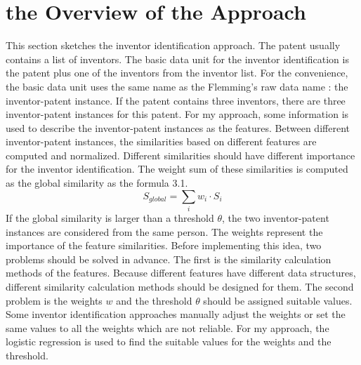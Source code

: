 \section{the Overview of the Approach}
This section sketches the inventor identification approach. The patent usually contains a list of inventors. The basic data unit for the inventor identification is the patent plus one of the inventors from the inventor list. For the convenience, the basic data unit uses the same name as the Flemming's raw data name \cite{RePEc:eee:respol:v:43:y:2014:i:6:p:941-955}: the inventor-patent instance. If the patent contains three inventors, there are three inventor-patent instances for this patent. For my approach, some information is used to describe the inventor-patent instances as the features. Between different inventor-patent instances, the similarities based on different features are computed and normalized. Different similarities should have different importance for the inventor identification. The weight sum of these similarities is computed as the global similarity as the formula 3.1. 
\begin{equation}
S_{global}=\sum_i w_i \cdot S_i 
\end{equation}
If the global similarity is larger than a threshold $\theta$, the two inventor-patent  instances are considered from the same person. The weights represent the importance of the feature similarities.
Before implementing this idea, two problems should be solved in advance. The first is the similarity calculation methods of the features. Because different features have different data structures, different similarity calculation methods should be designed for them. The second problem is the weights $w$ and the threshold $\theta$ should be assigned suitable values. Some inventor identification approaches manually adjust the weights or set the same values to all the weights which are not reliable. For my approach, the logistic regression is used to find the suitable values for the weights and the threshold. 
\newline

